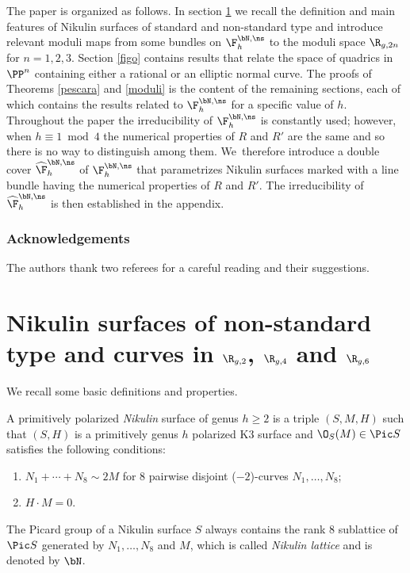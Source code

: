 The paper is organized as follows. In section \ref{sec:def} we recall the definition and main features of Nikulin surfaces of standard and non-standard type and introduce relevant moduli maps from some bundles on $\F_h^{\bN,\ns}$ to the moduli space $\R_{g,2n}$ for $n=1,2,3$. Section \ref{figo} contains results that relate the space of quadrics in $\PP^n$ containing either a rational or an elliptic normal curve. The proofs of Theorems \ref{pescara} and \ref{moduli} is the content of the remaining sections, each of which contains the results related to $\F_h^{\bN,\ns}$ for a specific value of $h$. Throughout the paper the irreducibility of $\F_h^{\bN,\ns}$ is constantly used; however, when $h \equiv 1 \bmod 4$ the numerical properties of $R$ and $R'$ are the same and so there is no way to distinguish among them. We~therefore introduce a double cover $\widehat{\F}_h^{\bN,\ns}$ of $\F_h^{\bN,\ns}$ that parametrizes Nikulin surfaces marked with a line bundle having the numerical properties of $R$ and $R'$. The irreducibility of $\widehat{\F}_h^{\bN,\ns}$ is then established in the appendix.

\subsubsection*{Acknowledgements} The authors thank two referees for a careful reading and their suggestions.

\section{Nikulin surfaces of non-standard type and curves in \texorpdfstring{$\R_{g,2}$, $\R_{g,4}$ and $\R_{g,6}$}{R}} \label{sec:def}

We recall some basic definitions and properties.
\begin{definition} \label{def:Nik}
A primitively polarized {\it Nikulin} surface of genus $h \geq 2$ is a triple $(S,M,H)$ such that
$(S,H)$ is a primitively genus $h$ polarized K3 surface and $\O_S(M)\in \Pic S$ satisfies the following conditions:
\begin{enumerate}
\item $ N_1+\cdots+N_8 \sim 2M$ for $8$ pairwise disjoint ($-2$)-curves $N_1,\ldots,N_8$;
\item $H \cdot M=0$.
\end{enumerate}
\end{definition}
The Picard group of a Nikulin surface $S$ always contains the rank $8$ sublattice of $\Pic S$ generated by $N_1,\ldots,N_8$ and $M$, which is called {\it Nikulin lattice} and is denoted by $\bN$.

